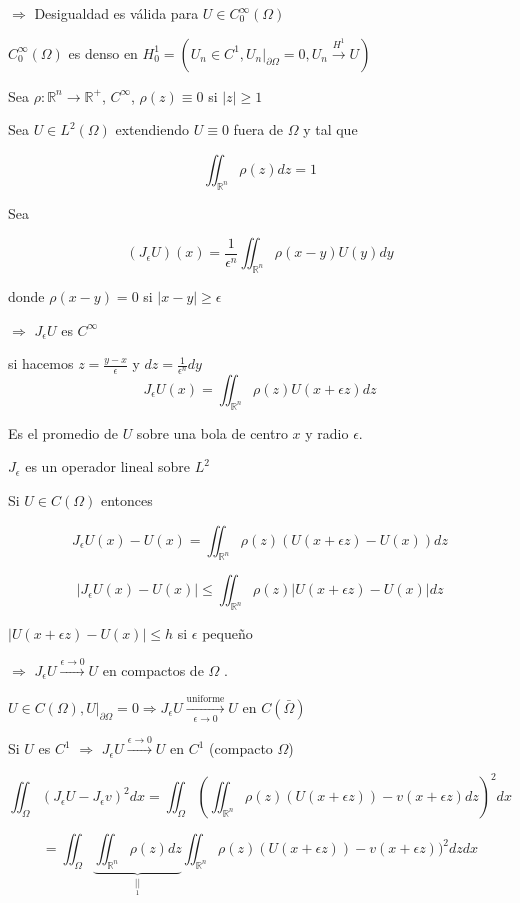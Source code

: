 \documentclass[a4paper,10pt]{book}
\def \ep{\epsilon}
\begin{document}
$\Rightarrow $ Desigualdad es válida para $U\in C_0^\infty(\Omega)$ 

$C_0^\infty(\Omega)$ es denso en $H_0^1= (U_n\in C^1 , U_n|_{\partial \Omega} =0 , U_n \overset{H^1}{\rightarrow} U  )$ 

Sea $\rho : \mathbb{R}^n \rightarrow \mathbb{R}^+$,  $C^\infty$, $\rho(z) \equiv 0$ si $|z| \geq 1$

Sea $U\in L^2(\Omega)$ extendiendo $U\equiv 0$ fuera de $\Omega$ y tal que

\[\iint_{\mathbb{R}^n} \rho(z) dz= 1\]

Sea

\[
(J_\epsilon U )(x) = \frac{1}{\epsilon^n} \iint_{\mathbb{R}^n} \rho(x-y) U(y) dy
\]

donde $\rho(x-y)=0$ si $|x-y|\geq \epsilon$ 

 $\Rightarrow$  $J_\epsilon U $ es $C^\infty$ 

 si hacemos $z=\frac{y-x}{\ep}$ y $dz= \frac{1}{\ep^n} dy$ 
 \[
 J_\ep U(x) = \iint_{\mathbb{R}^n} \rho(z) U( x+\ep z) dz\]

Es el promedio de $U$ sobre una bola de centro $x$ y radio $\ep$. 

$J_\ep$ es un operador lineal sobre $L^2$

Si $U\in C(\Omega)$ entonces

\[
J_\ep U(x)-U(x) = \iint_{\mathbb{R}^n }\rho(z) \left(U(x+\ep z) -U(x)  \right) dz
\]

\[
\left| J_\ep U(x)-U(x) \right| \leq \iint_{\mathbb{R}^n }\rho(z) \left|U(x+\ep z) -U(x)  \right| dz
\]


$\left|U(x+\ep z) -U(x)  \right| \leq h$ si $\ep$ pequeño

$\Rightarrow$ $J_\ep U \overset{\ep\rightarrow 0}{\rightarrow} U $ en compactos de $\Omega$ .

$U \in C(\Omega) , U|_{ \partial \Omega} =0 \Rightarrow J_\ep U \overset{\text{uniforme}}{\underset{\ep \rightarrow 0}{\rightarrow}} U $ en $C(\bar{\Omega})$


Si $U$ es $C^1$ $\Rightarrow$  $J_\ep U \overset{\ep\rightarrow 0}{ \rightarrow} U $  en $C^1$ (compacto $\Omega$)

\[
\iint_\Omega ( J_\ep U - J_\ep v )^2 dx =\iint_\Omega \left( \iint_{\mathbb{R}^n} \rho (z) ( U(x+\ep z)) -v(x+\ep z) dz\right)^2 dx
\]

\[
=\iint_\Omega \underset{\underset{1}{||}}{ \underbrace{\iint_{\mathbb{R}^n} \rho (z) dz}}  \iint_{\mathbb{R}^n} \rho (z) ( U(x+\ep z)) -v(x+\ep z) )^2 dz dx
\] 
\end{document}
